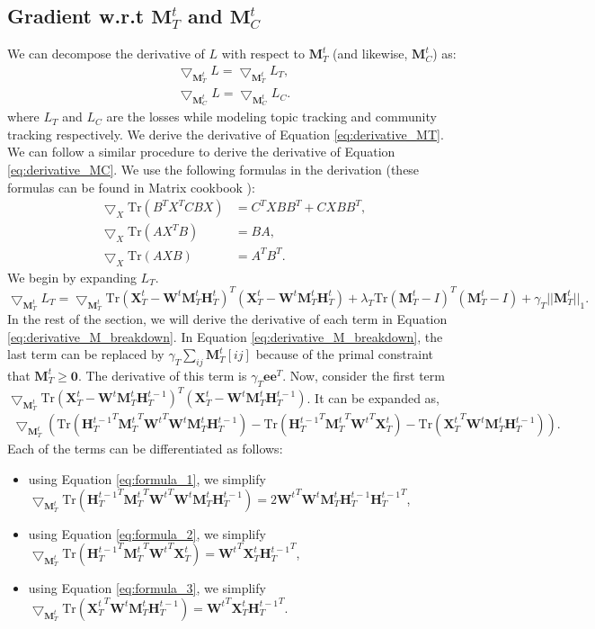\documentclass[a4paper,10pt]{article}
\newcommand{\W}{\textbf{W}^t}
\newcommand{\HT}{\textbf{H}^t_T}
\newcommand{\MT}{\textbf{M}^t_T}
\newcommand{\MC}{\textbf{M}^t_C}
\newcommand{\HTtt}{\textbf{H}^{t-1}_T}
\newcommand{\XT}{\textbf{X}^t_T}
\newcommand{\0}{\textbf{0}}
\newcommand{\e}{\textbf{e}}
\begin{document}
\subsection{Gradient w.r.t $\MT$ and $\MC$}
We can decompose the derivative of $L$ with respect to $\MT$ (and likewise, $\MC$) as:
\begin{eqnarray}
\bigtriangledown_{\MT}L = \bigtriangledown_{\MT}L_T,\label{eq:derivative_MT} \\
\bigtriangledown_{\MC}L = \bigtriangledown_{\MC}L_C. \label{eq:derivative_MC}
\end{eqnarray}
where $L_T$ and $L_C$ are the losses while modeling topic tracking and community tracking respectively.
We derive the derivative of Equation \ref{eq:derivative_MT}.  We can follow a similar procedure to derive the derivative
of Equation \ref{eq:derivative_MC}.  We use the following formulas in the derivation (these formulas can be found in Matrix cookbook
\cite{matrixcookbook}):
\begin{align}
\bigtriangledown_{X}\text{Tr}(B^TX^TCBX) &= C^TXBB^T + CXBB^T, \label{eq:formula_1} \\
\bigtriangledown_{X}\text{Tr}(AX^TB) &= BA, \label{eq:formula_2} \\
\bigtriangledown_{X}\text{Tr}(AXB) &= A^TB^T. \label{eq:formula_3}
\end{align}
We begin by expanding $L_T$.
\begin{equation}
\bigtriangledown_{\MT}L_T = \bigtriangledown_{\MT}\text{Tr}(\XT - \W\MT\HT)^T(\XT - \W\MT\HT) + \lambda_T\text{Tr}(\MT - I)^T(\MT - I) + \gamma_T ||\MT||_1. \label{eq:derivative_M_breakdown}
\end{equation}
In the rest of the section, we will derive the derivative of each term in Equation \ref{eq:derivative_M_breakdown}.
In Equation \ref{eq:derivative_M_breakdown}, the last term can be replaced by $\gamma_T\sum_{ij}{\MT}[ij]$ because of the primal constraint
that $\MT \geq \0$.  The derivative of this term is $\gamma_T\e{\e}^T$.  Now, consider the first
term $ \bigtriangledown_{\MT}\text{Tr}(\XT - \W\MT\HTtt)^T(\XT - \W\MT\HTtt) $.  It can be expanded as,
\begin{align}
\bigtriangledown_{\MT}\left(\text{Tr}({\HTtt}^T{\MT}^T{\W}^T\W\MT\HTtt) - \text{Tr}({\HTtt}^T{\MT}^T{\W}^T\XT) - \text{Tr}({\XT}^T\W\MT\HTtt)\right).
\end{align}
Each of the terms can be differentiated as follows:
\begin{itemize}
\item using Equation \ref{eq:formula_1}, we simplify $\bigtriangledown_{\MT}\text{Tr}({\HTtt}^T{\MT}^T{\W}^T\W\MT\HTtt) = 2{\W}^T\W\MT\HTtt{\HTtt}^T$,
\item using Equation \ref{eq:formula_2}, we simplify $\bigtriangledown_{\MT}\text{Tr}({\HTtt}^T{\MT}^T{\W}^T\XT) = {\W}^T\XT{\HTtt}^T$,
\item using Equation \ref{eq:formula_3}, we simplify $\bigtriangledown_{\MT}\text{Tr}({\XT}^T\W\MT\HTtt) = {\W}^T\XT{\HTtt}^T$.  
\end{itemize}
\end{document}
